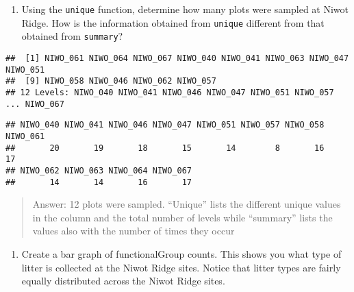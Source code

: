 \documentclass[
]{article}
\newenvironment{Shaded}{\begin{snugshade}}{\end{snugshade}}
\newcommand{\KeywordTok}[1]{\textcolor[rgb]{0.13,0.29,0.53}{\textbf{#1}}}
\newcommand{\NormalTok}[1]{#1}
\newcommand{\OperatorTok}[1]{\textcolor[rgb]{0.81,0.36,0.00}{\textbf{#1}}}
\providecommand{\tightlist}{%
  \setlength{\itemsep}{0pt}\setlength{\parskip}{0pt}}
\begin{document}
\begin{enumerate}
\def\labelenumi{\arabic{enumi}.}
\setcounter{enumi}{12}
\tightlist
\item
  Using the \texttt{unique} function, determine how many plots were
  sampled at Niwot Ridge. How is the information obtained from
  \texttt{unique} different from that obtained from \texttt{summary}?
\end{enumerate}

\begin{Shaded}
\end{Shaded}

\begin{verbatim}
##  [1] NIWO_061 NIWO_064 NIWO_067 NIWO_040 NIWO_041 NIWO_063 NIWO_047 NIWO_051
##  [9] NIWO_058 NIWO_046 NIWO_062 NIWO_057
## 12 Levels: NIWO_040 NIWO_041 NIWO_046 NIWO_047 NIWO_051 NIWO_057 ... NIWO_067
\end{verbatim}

\begin{Shaded}
\end{Shaded}

\begin{verbatim}
## NIWO_040 NIWO_041 NIWO_046 NIWO_047 NIWO_051 NIWO_057 NIWO_058 NIWO_061 
##       20       19       18       15       14        8       16       17 
## NIWO_062 NIWO_063 NIWO_064 NIWO_067 
##       14       14       16       17
\end{verbatim}

\begin{quote}
Answer: 12 plots were sampled. ``Unique'' lists the different unique
values in the column and the total number of levels while ``summary''
lists the values also with the number of times they occur
\end{quote}

\begin{enumerate}
\def\labelenumi{\arabic{enumi}.}
\setcounter{enumi}{13}
\tightlist
\item
  Create a bar graph of functionalGroup counts. This shows you what type
  of litter is collected at the Niwot Ridge sites. Notice that litter
  types are fairly equally distributed across the Niwot Ridge sites.
\end{enumerate}
\end{document}
